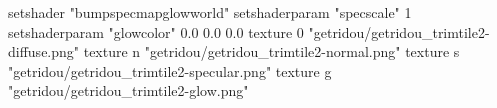 setshader "bumpspecmapglowworld"
setshaderparam "specscale" 1
setshaderparam "glowcolor" 0.0 0.0 0.0
texture 0 "getridou/getridou_trimtile2-diffuse.png"
texture n "getridou/getridou_trimtile2-normal.png"
texture s "getridou/getridou_trimtile2-specular.png"
texture g "getridou/getridou_trimtile2-glow.png"